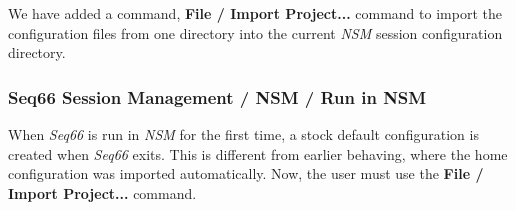 
   We have added a command, \textbf{File / Import Project...}
   command to import the configuration files from one directory into the
   current \textsl{NSM} session configuration directory.

\subsubsection{Seq66 Session Management / NSM / Run in NSM}
\label{subsec:sessions_nsm_first_run_in_nsm}

   When \textsl{Seq66} is run in \textsl{NSM} for the first time,
   a stock default configuration is created when
   \textsl{Seq66} exits.
   This is different from earlier behaving, where the home configuration was
   imported automatically.
   Now, the user must use the
   \textbf{File / Import Project...}
   command.




